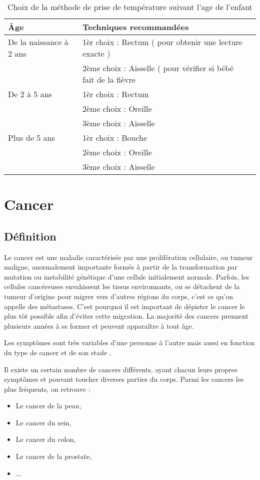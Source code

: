 \documentclass[12pt]{article}
\begin{document}
\begin{table}[h]
	\centering
	\caption{Choix de la méthode de prise de température suivant l’age de l’enfant}
	\begin{tabular}{ | l | l | c }
		\hline
		\bfseries{Âge} & \bfseries{Techniques recommandées}\\ \hline
		De la naissance à 2 ans & 1èr choix : Rectum ( pour obtenir une lecture exacte )\\
		                                      &  2ème choix : Aisselle ( pour vérifier si bébé fait de la fièvre\\
\hline
		De 2 à 5 ans & 1èr choix : Rectum\\
							& 2ème choix : Oreille\\
							& 3ème choix : Aisselle\\ 
\hline
		Plus de 5 ans & 1èr choix : Bouche\\
							  & 2ème choix : Oreille\\
							  & 3ème choix : Aisselle\\ 
\hline 
	\end{tabular}
\end{table}




\section{Cancer}
\subsection{Définition}
Le cancer est une maladie caractérisée par une prolifération cellulaire, ou tumeur maligne, anormalement importante formée à partir de la transformation par mutation ou instabilité génétique d'une cellule initialement normale. Parfois, les cellules cancéreuses envahissent les tissus environnants, ou se détachent de la tumeur d'origine pour migrer vers d'autres régions du corps, c'est ce qu'on appelle des métastases. C'est pourquoi il est important de dépister le cancer le plus tôt possible afin d'éviter cette migration. La majorité des cancers prennent plusieurs années à se former et peuvent apparaître à tout âge. 

Les symptômes sont très variables d'une personne à l'autre mais aussi en fonction du type de cancer et de son stade \cite{31}.

Il existe un certain nombre de cancers différents, ayant chacun leurs propres symptômes et pouvant toucher diverses parties du corps. Parmi les cancers les plus fréquents, on retrouve :
\begin{itemize}
	\item  Le cancer de la peau,
	\item Le cancer du sein,
	\item Le cancer du colon,
	\item Le cancer de la prostate,
	\item ...
\end{itemize}
\end{document}
